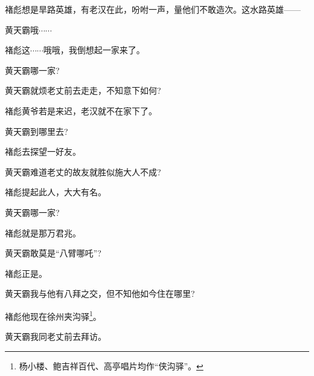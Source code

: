 {{褚彪\hspace{30pt}想是旱路英雄，有老汉在此，吩咐一声，量他们不敢造次。这水路英雄------

黄天霸\hspace{20pt}哦$\cdots{}\cdots{}$

褚彪\hspace{30pt}这$\cdots{}\cdots{}$哦哦，我倒想起一家来了。

黄天霸\hspace{20pt}哪一家?


黄天霸\hspace{20pt}就烦老丈前去走走，不知意下如何?

褚彪\hspace{30pt}黄爷若是来迟，老汉就不在家下了。

黄天霸\hspace{20pt}到哪里去?

褚彪\hspace{30pt}去探望一好友。

黄天霸\hspace{20pt}难道老丈的故友就胜似施大人不成?

褚彪\hspace{30pt}提起此人，大大有名。

黄天霸\hspace{20pt}哪一家?

褚彪\hspace{30pt}就是那万君兆。

黄天霸\hspace{20pt}敢莫是``八臂哪吒''?

褚彪\hspace{30pt}正是。

黄天霸\hspace{20pt}我与他有八拜之交，但不知他如今住在哪里?

褚彪\hspace{30pt}他现在徐州夹沟驿\footnote{杨小楼、鲍吉祥百代、高亭唱片均作``侠沟驿''。}。

黄天霸\hspace{20pt}我同老丈前去拜访。


}}
